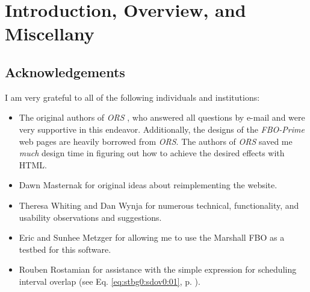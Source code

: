 \documentclass[letterpaper,10pt,titlepage]{article}
\newcommand{\productbasename}{FBO-Prime}
\begin{document}
\clearpage{}
\tableofcontents{}
\clearpage{}
\listoffigures
\clearpage{}

%
\setcounter{page}{1}

\section{Introduction, Overview, and Miscellany}
\label{siov0}


\subsection{Acknowledgements}
\label{siov0:sack0}

I am very grateful to all of the following individuals and institutions:

\begin{itemize}
\item The original authors of 
      \emph{ORS} \cite{bibref:p:ors},
      who answered all questions by e-mail and were very supportive in
      this endeavor.  Additionally, the designs of the
      \emph{\productbasename{}} web pages are heavily borrowed from 
      \emph{ORS}\@. The authors of \emph{ORS} saved me \emph{much} design time in 
      figuring out how to achieve the desired effects with HTML.
\item {}Dawn 
      Masternak \cite{bibref:i:masternakdawn} for original ideas about
      reimplementing the website.
\item {}Theresa Whiting \cite{bibref:i:whitingtheresa}
      and
      Dan Wynja \cite{bibref:i:wynjadaniel}
      for numerous technical, functionality, and usability
      observations and suggestions.
\item {}Eric and 
       Sunhee Metzger \cite{bibref:i:metzgereric}
      for allowing me to use the Marshall FBO as a testbed for
      this software.
\item {}Rouben Rostamian \cite{bibref:i:rostamianrouben} for assistance with
      the simple expression for scheduling interval overlap 
          (see Eq. \ref{eq:stbg0:sdov0:01}, p. \pageref{eq:stbg0:sdov0:01}). 
\end{itemize} 
\end{document}
